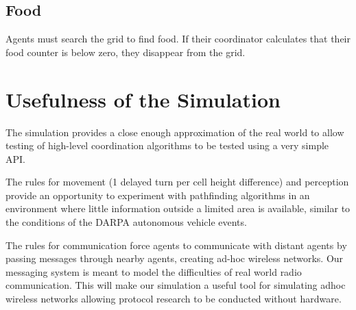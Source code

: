 \subsection{Food}

Agents must search the grid to find food. If their coordinator calculates that their food counter is
below zero, they disappear from the grid.

\section{Usefulness of the Simulation}

The simulation provides a close enough approximation of the real world to allow testing of
high-level coordination algorithms to be tested using a very simple API.

The rules for movement (1 delayed turn per cell height difference) and perception provide an
opportunity to experiment with pathfinding algorithms in an environment where little information
outside a limited area is available, similar to the conditions of the DARPA autonomous vehicle
events.

The rules for communication force agents to communicate with distant agents by passing messages
through nearby agents, creating ad-hoc wireless networks. Our messaging system is meant to model the
difficulties of real world radio communication. This will make our simulation a useful tool for
simulating adhoc wireless networks allowing protocol research to be conducted without hardware.

